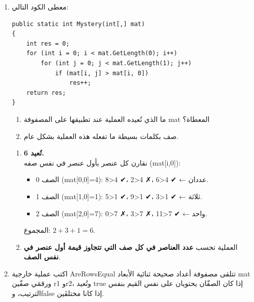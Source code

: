 \documentclass[14pt]{extarticle}
\begin{document}
\begin{enumerate}[itemsep=2em]
\item
معطى الكود التالي:

\begin{boxCode}
\begin{english}
\begin{verbatim}
public static int Mystery(int[,] mat)
{
    int res = 0;
    for (int i = 0; i < mat.GetLength(0); i++)
        for (int j = 0; j < mat.GetLength(1); j++)
            if (mat[i, j] > mat[i, 0])
                res++;
    return res;
}
\end{verbatim}
\end{english}
\end{boxCode}

\begin{enumerate}[itemsep=8pt]
    \item ما الذي تُعيده العملية عند تطبيقها على المصفوفة \textenglish{mat} المعطاة؟
    \item صف بكلمات بسيطة ما تفعله هذه العملية بشكل عام.
\end{enumerate}

\ifwithsols
\begin{boxSolution}
\begin{enumerate}[itemsep=6pt]
    \item \textbf{تُعيد \textenglish{6}.} \\
    نقارن كل عنصر بأول عنصر في نفس صفه (\textenglish{mat[i,0]}):
    \begin{itemize}[itemsep=1pt]
        \item الصف 0 (\textenglish{mat[0,0]=4}): 8>4 ✔، 2>4 ✗، 6>4 ✔ ← عددان.
        \item الصف 1 (\textenglish{mat[1,0]=1}): 5>1 ✔، 9>1 ✔، 3>1 ✔ ← ثلاثة.
        \item الصف 2 (\textenglish{mat[2,0]=7}): 0>7 ✗، 3>7 ✗، 11>7 ✔ ← واحد.
    \end{itemize}
    المجموع: $2+3+1 = 6$.

    \item العملية تحسب \textbf{عدد العناصر في كل صف التي تتجاوز قيمة أول عنصر في نفس الصف}.
\end{enumerate}
\end{boxSolution}
\clearpage
\fi

\item
اكتب عملية خارجية \textenglish{AreRowsEqual} تتلقى مصفوفة أعداد صحيحة ثنائية الأبعاد \textenglish{mat} ورقمَي صفّين \textenglish{r1} و\textenglish{r2}، وتُعيد \textenglish{true} إذا كان الصفّان يحتويان على نفس القيم بنفس الترتيب، و\textenglish{false} إذا كانا مختلفَين.


\end{enumerate}
\end{document}
